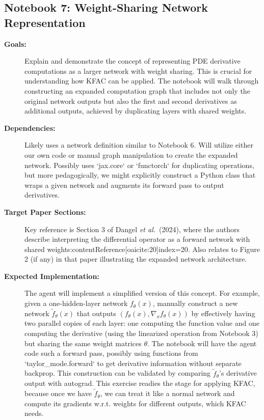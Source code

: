 \documentclass[11pt]{article}
\begin{document}
\subsection{Notebook 7: Weight-Sharing Network Representation}
\begin{description}
  \item[\textbf{Goals:}] Explain and demonstrate the concept of representing PDE derivative computations as a larger network with weight sharing. This is crucial for understanding how KFAC can be applied. The notebook will walk through constructing an expanded computation graph that includes not only the original network outputs but also the first and second derivatives as additional outputs, achieved by duplicating layers with shared weights.
  \item[\textbf{Dependencies:}] Likely uses a network definition similar to Notebook 6. Will utilize either our own code or manual graph manipulation to create the expanded network. Possibly uses `jax.core` or `functorch` for duplicating operations, but more pedagogically, we might explicitly construct a Python class that wraps a given network and augments its forward pass to output derivatives.
  \item[\textbf{Target Paper Sections:}] Key reference is Section 3 of Dangel \textit{et al.}\ (2024), where the authors describe interpreting the differential operator as a forward network with shared weights:contentReference[oaicite:20]{index=20}. Also relates to Figure 2 (if any) in that paper illustrating the expanded network architecture.
  \item[\textbf{Expected Implementation:}] The agent will implement a simplified version of this concept. For example, given a one-hidden-layer network $f_\theta(x)$, manually construct a new network $\tilde{f}_\theta(x)$ that outputs $(f_\theta(x), \nabla_x f_\theta(x))$ by effectively having two parallel copies of each layer: one computing the function value and one computing the derivative (using the linearized operation from Notebook 3) but sharing the same weight matrices $\theta$. The notebook will have the agent code such a forward pass, possibly using functions from `taylor_mode.forward` to get derivative information without separate backprop. This construction can be validated by comparing $\tilde{f}_\theta$'s derivative output with autograd. This exercise readies the stage for applying KFAC, because once we have $\tilde{f}_\theta$, we can treat it like a normal network and compute its gradients w.r.t. weights for different outputs, which KFAC needs.
\end{description}
\end{document}
